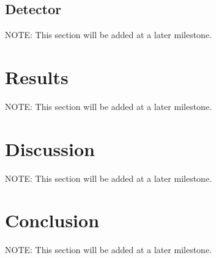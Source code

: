 \documentclass[9pt,twoside]{pnas-new}
\begin{document}
\subsection*{Detector}
NOTE: This section will be added at a later milestone.

\section*{Results} 
NOTE: This section will be added at a later milestone.

\section*{Discussion}
NOTE: This section will be added at a later milestone.


\section*{Conclusion}
NOTE: This section will be added at a later milestone.


\end{document}

